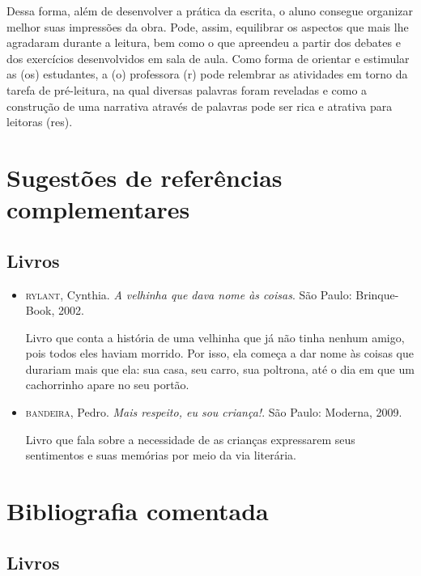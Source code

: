 \documentclass[11pt]{extarticle}
\begin{document}
Dessa forma, além de desenvolver a prática da escrita, o aluno consegue organizar melhor suas impressões da obra. Pode, assim, equilibrar os aspectos que mais lhe agradaram durante a leitura, bem como o que apreendeu a partir dos debates e dos exercícios desenvolvidos em sala de aula. Como forma de orientar e estimular as (os) estudantes, a (o) professora (r) pode relembrar as atividades em torno da tarefa de pré-leitura, na qual diversas palavras foram reveladas e como a construção de uma narrativa através de palavras pode ser rica e atrativa para leitoras (res).

\section{Sugestões de referências complementares}

\subsection{Livros} 

\begin{itemize}
\item \textsc{rylant}, Cynthia. \textit{A velhinha que dava nome às coisas}. São Paulo: Brinque-Book, 2002.

Livro que conta a história de uma velhinha que já não tinha nenhum amigo, pois todos eles haviam morrido. Por isso, ela começa a dar nome às coisas que durariam mais que ela: sua casa, seu carro, sua poltrona, até o dia em que um cachorrinho apare no seu portão.

\item \textsc{bandeira}, Pedro. \textit{Mais respeito, eu sou criança!}. São Paulo: Moderna, 2009.

Livro que fala sobre a necessidade de as crianças expressarem seus sentimentos e suas memórias por meio da via literária.

\end{itemize}

\section{Bibliografia comentada}
\subsection{Livros}
\end{document}
